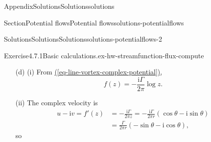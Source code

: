 \documentclass[oneside,10pt,]{book}
\newcommand{\xreffont}{\relax}
\numberwithin{equation}{section}
\newcommand{\im}{\mathrm{i}}
\newcommand{\de}{\mathrm{d}}
\newcommand{\bn}{\boldsymbol{n}}
\newcommand{\bu}{\boldsymbol{u}}
\newcommand{\br}{\boldsymbol{r}}
\newcommand{\amp}{&}
\begin{document}
\begin{appendixptx}{Appendix}{Solutions}{}{Solutions}{}{}{solutions}
\begin{sectionptx}{Section}{Potential flows}{}{Potential flows}{}{}{solutions-potentialflows}
\begin{solutions-subsection-numberless}{Solutions}{Solutions}{}{Solutions}{}{}{solutions-potentialflows-2}
\begin{exercisegroup}
\begin{divisionsolutioneg}{Exercise}{4.7.1}{Basic calculations.}{ex-hw-streamfunction-flux-compute}
\begin{enumerate}[font=\bfseries,label=(\alph*),ref=\alph*]
\begin{equation*}
f(z) = \frac{z^2}{2}.
\end{equation*}
%
\par
(ii) The complex velocity is \(f'(z) = z = x + \im y = u - \im v\), so%
\begin{equation*}
\bu = [x, -y].
\end{equation*}
%
\par
(iii) On the unit circle, \([x, y] = [\cos\theta, \sin\theta]\), \(\bn = [\cos\theta, \sin\theta]\) and \(\de{s} = \de\theta\), so%
\begin{align*}
\int_{r = 1} \bu \cdot \bn \, \de{s} \amp= \int_0^{2\pi} [\cos\theta, -\sin\theta] \cdot [\cos\theta, \sin\theta] \, \de\theta\\
\amp= \int_0^{2\pi} (\cos^2\theta - \sin^2\theta) \, \de\theta = \int_0^{2\pi} \cos 2\theta \, \de\theta = 0.
\end{align*}
Fluid enters the circle near the \(y\)-axis and leaves near the \(x\)-axis, with no net flux.%
\par
(iv) As in part (a), parametrise the plate by \(\br(t) = [t, 1 - t]\), \(0 \leq t \leq 1\), with \(\bn = [1, 1]/\sqrt{2}\) and \(\de{s} = \sqrt{2}\,\de{t}\). On the plate, \(\bu = [t, -(1 - t)]\), so%
\begin{align*}
\textrm{flux} \amp= \int_0^1 [t, -(1 - t)] \cdot \frac{[1, 1]}{\sqrt{2}} \, \sqrt{2}\,\de{t}\\
\amp= \int_0^1 (2t - 1) \, \de{t} = \Bigl[t^2 - t\Bigr]_0^1 = 0.
\end{align*}
This is consistent with \hyperref[thm-flux-streamlines]{Theorem~{\xreffont\ref{thm-flux-streamlines}}}: the streamfunction \(\psi = xy\) is zero at both ends of the plate, \((0, 1)\) and \((1, 0)\).%
\item[(d)]\noindent\hypertarget{ex-hw-streamfunction-flux-compute-6-3-main}{}(i) From \hyperref[eq-line-vortex-complex-potential]{({\xreffont\ref{eq-line-vortex-complex-potential}})},%
\begin{equation*}
f(z) = -\frac{\im\Gamma}{2\pi}\log z.
\end{equation*}
%
\par
(ii) The complex velocity is%
\begin{align*}
u - \im v = f'(z) \amp= -\frac{\im\Gamma}{2\pi z} = -\frac{\im\Gamma}{2\pi r}(\cos\theta - \im\sin\theta)\\
\amp= \frac{\Gamma}{2\pi r}(-\sin\theta - \im\cos\theta),
\end{align*}
so%
\begin{equation*}

\end{equation*}
\end{enumerate}
\end{divisionsolutioneg}
\end{exercisegroup}
\end{solutions-subsection-numberless}
\end{sectionptx}
\end{appendixptx}
\end{document}
